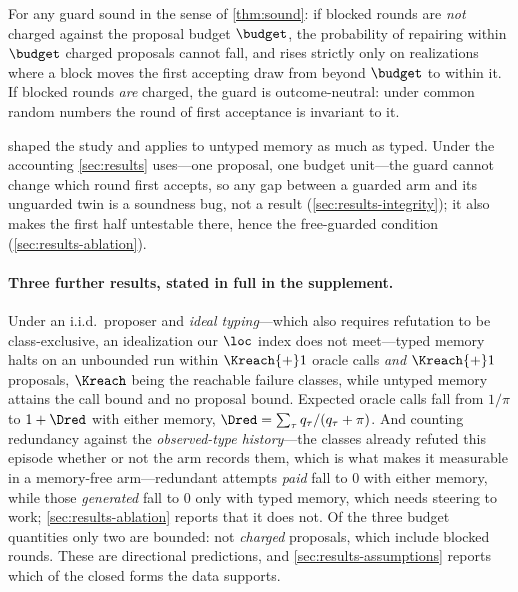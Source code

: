 \begin{corollary}
\label{cor:budget}
For any guard sound in the sense of \cref{thm:sound}: if blocked rounds are
\emph{not} charged against the proposal budget $\budget$, the probability of
repairing within $\budget$ charged proposals cannot fall, and rises strictly
only on realizations where a block moves the first accepting draw from beyond
$\budget$ to within it. If blocked rounds \emph{are} charged, the guard
is outcome-neutral: under common random numbers the round of first acceptance
is invariant to it.
\end{corollary}

 shaped the study and applies to untyped memory as much as
typed. Under the accounting \cref{sec:results} uses---one proposal, one budget
unit---the guard cannot change which round first accepts, so any gap between a
guarded arm and its unguarded twin is a soundness bug, not a result
(\cref{sec:results-integrity}); it also makes the first half untestable there,
hence the free-guarded condition (\cref{sec:results-ablation}).

\paragraph{Three further results, stated in full in the supplement.}
Under an i.i.d.\ proposer and \emph{ideal typing}---which also requires
refutation to be class-exclusive, an idealization our $\loc$ index does not
meet---typed memory halts on an unbounded run within $\Kreach{+}1$ oracle calls
\emph{and} $\Kreach{+}1$ proposals, $\Kreach$ being the reachable failure
classes, while untyped memory attains the call bound and no proposal bound.
Expected oracle calls fall from $1/\pi$ to $1 + \Dred$ with either memory,
$\Dred = \sum_\tau q_\tau/(q_\tau + \pi)$. And counting redundancy against the
\emph{observed-type history}---the classes already refuted this episode whether
or not the arm records them, which is what makes it measurable in a memory-free
arm---redundant attempts \emph{paid} fall to $0$ with either memory, while
those \emph{generated} fall to $0$ only with typed memory, which needs steering
to work; \cref{sec:results-ablation} reports that it does not. Of the three
budget quantities only two are bounded: not \emph{charged} proposals, which
include blocked rounds. These are directional predictions, and
\cref{sec:results-assumptions} reports which of the closed forms the data
supports.

